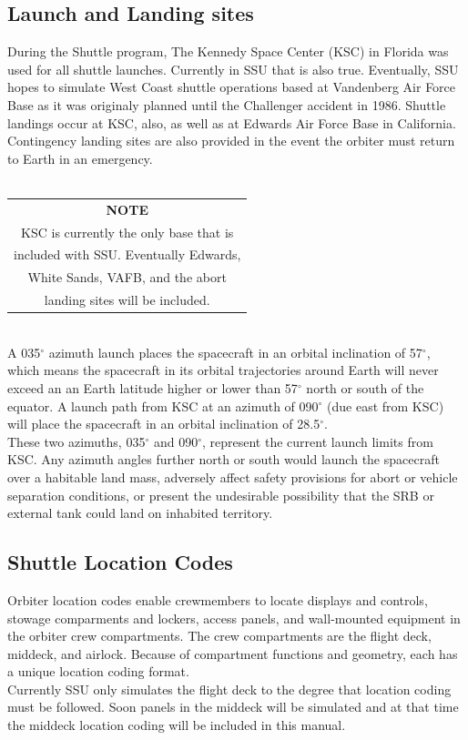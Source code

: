 \documentclass[13pt, letter,final]{article}
\begin{document}
\begin{multicols}{2}
\subsection*{\large Launch and Landing sites}
During the Shuttle program, The Kennedy Space Center (KSC) in Florida was used for all shuttle launches. Currently in SSU that is also true. Eventually, SSU hopes to simulate West Coast shuttle operations based at Vandenberg Air Force Base as it was originaly planned until the Challenger accident in 1986. Shuttle landings occur at KSC, also, as well as at Edwards Air Force Base in California. Contingency landing sites are also provided in the event the orbiter must return to Earth in an emergency.\\
\\
\begin{tabular}{c}
	\bfseries NOTE\\[0.3cm] KSC is currently the only base that is\\ included with SSU.  Eventually Edwards,\\ White Sands, VAFB, and the abort\\ landing sites will be included.
\end{tabular}
\\[0.5cm]
A 035$^{\circ}$ azimuth launch places the spacecraft in an orbital inclination of 57$^{\circ}$, which means the spacecraft in its orbital trajectories around Earth will never exceed an an Earth latitude higher or lower than 57$^{\circ}$ north or south of the equator. A launch path from KSC at an azimuth of 090$^{\circ}$ (due east from KSC) will place the spacecraft in an orbital inclination of 28.5$^{\circ}$.
\\
These two azimuths, 035$^{\circ}$ and 090$^{\circ}$, represent the current launch limits from KSC. Any azimuth angles further north or south would launch the spacecraft over a habitable land mass, adversely affect safety provisions for abort or vehicle separation conditions, or present the undesirable possibility that the SRB or external tank could land on inhabited territory.
\\
\subsection*{\large Shuttle Location Codes}
Orbiter location codes enable crewmembers to locate displays and controls, stowage comparments and lockers, access panels, and wall-mounted equipment in the orbiter crew compartments. The crew compartments are the flight deck, middeck, and airlock. Because of compartment functions and geometry, each has a unique location coding format.
\\
Currently SSU only simulates the flight deck to the degree that location coding must be followed. Soon panels in the middeck will be simulated and at that time the middeck location coding will be included in this manual.
\\
\begin{center}

\end{center}
\end{multicols}
\end{document}
